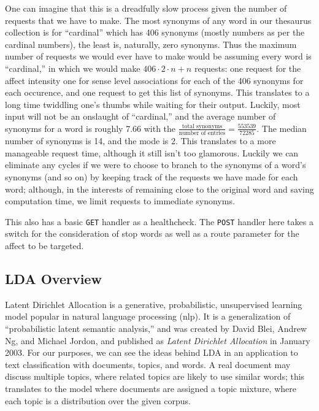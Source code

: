 \documentclass[11pt, twoside, reqno]{book}
\begin{document}
One can imagine that this is a dreadfully slow process given the number of requests that we have to make. The most synonyms of any word in our thesaurus collection is for ``cardinal'' which has 406 synonyms (mostly numbers as per the cardinal numbers), the least is, naturally, zero synonyms. Thus the maximum number of requests we would ever have to make would be assuming every word is ``cardinal,'' in which we would make $406 \cdot 2 \cdot n + n$ requests: one request for the affect intensity one for sense level associations for each of the 406 synonyms for each occurence, and one request to get this list of synonyms. This translates to a long time twiddling one's thumbs while waiting for their output. Luckily, most input will not be an onslaught of ``cardinal,'' and the average number of synonyms for a word is roughly 7.66 with the $\frac{\text{total synonyms}}{\text{number of entries}} = \frac{553539}{72285}$. The median number of synonyms is 14, and the mode is 2. This translates to a more manageable request time, although it still isn't too glamorous. Luckily we can eliminate any cycles if we were to choose to branch to the synonyms of a word's synonyms (and so on) by keeping track of the requests we have made for each word; although, in the interests of remaining close to the original word and saving computation time, we limit requests to immediate synonyms.

This also has a basic \texttt{GET} handler as a healthcheck. The \texttt{POST} handler here takes a switch for the consideration of stop words as well as a route parameter for the affect to be targeted.

\subsection{LDA Overview}

Latent Dirichlet Allocation is a generative, probabilistic, unsupervised learning model popular in natural language processing (nlp). It is a generalization of ``probabilistic latent semantic analysis,'' and was created by David Blei, Andrew Ng, and Michael Jordon, and published as \textit{Latent Dirichlet Allocation} in January 2003. For our purposes, we can see the ideas behind LDA in an application to text classification with documents, topics, and words. A real document may discuss multiple topics, where related topics are likely to use similar words; this translates to the model where documents are assigned a topic mixture, where each topic is a distribution over the given corpus.
\end{document}
